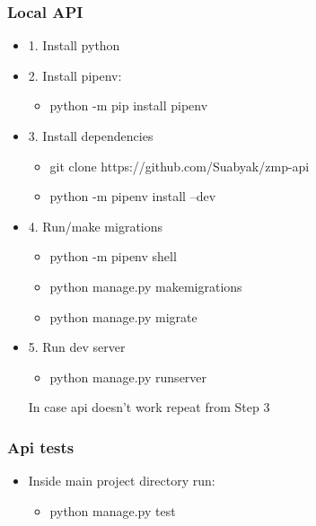 \documentclass{article}
\begin{document}
\subsubsection{Local API}
\begin{itemize}
\item 1. Install python
\item 2. Install pipenv:
\begin{itemize}
    \item python -m pip install pipenv
\end{itemize}

\item 3. Install dependencies

\begin{itemize}
    \item git clone https://github.com/Suabyak/zmp-api
    \item python -m pipenv install --dev
\end{itemize}

\item 4. Run/make migrations

\begin{itemize}
    \item python -m pipenv shell
    \item python manage.py makemigrations
    \item python manage.py migrate
\end{itemize}

\item 5. Run dev server

\begin{itemize}
    \item python manage.py runserver
\end{itemize}

In case api doesn't work repeat from Step 3

\end{itemize}
\subsubsection{Api tests}
\begin{itemize}
    \item Inside main project directory run:
    \begin{itemize}
        \item python manage.py test
    \end{itemize}
\end{itemize}
\end{document}
